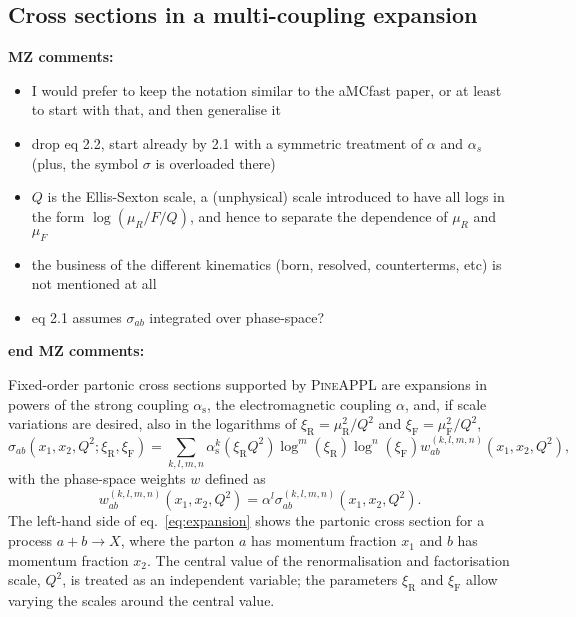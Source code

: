 \subsection{Cross sections in a multi-coupling expansion}
\label{sec:multi-coupling-expansion}
{\bf MZ comments:}
\begin{itemize}
    \item I would prefer to keep the notation similar to the aMCfast paper, or at least to start with that, and then generalise it
    \item drop eq 2.2, start already by 2.1 with a symmetric treatment of $\alpha$ and $\alpha_s$ (plus, the symbol $\sigma$ is overloaded there)
    \item $Q$ is the Ellis-Sexton scale, a (unphysical) scale introduced to have all logs in the form $\log(\mu_R/F / Q)$, and hence to separate
        the dependence of $\mu_R$ and $\mu_F$
    \item the business of the different kinematics (born, resolved, counterterms, etc) is not mentioned at all
    \item eq 2.1 assumes $\sigma_{ab}$ integrated over phase-space?
\end{itemize}
{\bf end MZ comments:}

Fixed-order partonic cross sections supported by \textsc{PineAPPL} are expansions in powers of the strong coupling $\alpha_\mathrm{s}$, the electromagnetic coupling $\alpha$, and, if scale variations are desired, also in the logarithms of $\xi_\mathrm{R} = \mu_\mathrm{R}^2 / Q^2$ and $\xi_\mathrm{F} = \mu_\mathrm{F}^2 / Q^2$,
\begin{equation}
\sigma_{ab} (x_1, x_2, Q^2; \xi_\mathrm{R}, \xi_\mathrm{F}) = \sum_{k,l,m,n} \alpha_\mathrm{s}^k \left( \xi_\mathrm{R} Q^2 \right) \log^m ( \xi_\mathrm{R} ) \log^n ( \xi_\mathrm{F} ) w_{ab}^{(k,l,m,n)} \left( x_1, x_2, Q^2 \right) \text{,}
\label{eq:expansion}
\end{equation}
with the phase-space weights $w$ defined as
\begin{equation}
w_{ab}^{(k,l,m,n)} \left( x_1, x_2, Q^2 \right) = \alpha^l \sigma_{ab}^{(k,l,m,n)} \left( x_1, x_2, Q^2 \right) \text{.}
\label{eq:phase-space-weight}
\end{equation}
The left-hand side of eq.~\eqref{eq:expansion} shows the partonic cross section for a process $a + b \to X$, where the parton $a$ has momentum fraction $x_1$ and $b$ has momentum fraction $x_2$.
The central value of the renormalisation and factorisation scale, $Q^2$, is treated as an independent variable; the parameters $\xi_\mathrm{R}$ and $\xi_\mathrm{F}$ allow varying the scales around the central value.

